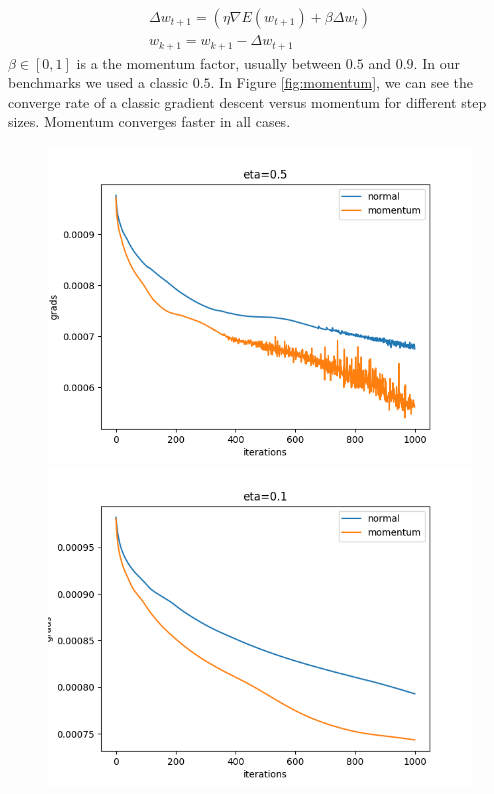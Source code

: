 \documentclass[11pt]{article}
\begin{document}
\begin{equation}
	\label{eq: momentum}
	\begin{split}
	\Delta w_{ t + 1} = (\eta \nabla E(w_{t + 1}) + \beta \Delta w_t) \\
	 w_{k + 1} = w_{k + 1} -   \Delta w_{ t + 1}
	 \end{split}
\end{equation}
$\beta \in [0,1]$ is a the momentum factor, usually between $0.5$ and $0.9$. In our benchmarks we used a classic $0.5$. In Figure \ref{fig:momentum}, we can see the converge rate of a classic gradient descent versus momentum for different step sizes. Momentum converges faster in all cases. 
\begin{figure}[H]
\centering
\includegraphics[scale=0.5]{images/momentum/momentum_plot_0.png}	
\includegraphics[scale=0.5]{images/momentum/momentum_plot_1.png}	

\end{figure}
\end{document}
